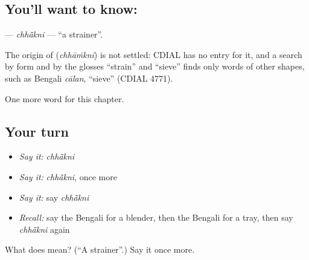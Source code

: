 \subsection*{You'll want to know: }
\textbf{} — \emph{chhā̃kni} — \textquotedblleft{}a strainer\textquotedblright{}.

\begin{cousinweb}
The origin of \textbf{} (\emph{chhāṁkni}) is not settled: CDIAL has no entry for it, and a search by form and by the glosses \textquotedblleft{}strain\textquotedblright{} and \textquotedblleft{}sieve\textquotedblright{} finds only words of other shapes, such as Bengali \emph{cālan}, \textquotedblleft{}sieve\textquotedblright{} (CDIAL 4771).
\end{cousinweb}

\begin{grammarlens}[title={What you've built}]
One more word for this chapter.
\end{grammarlens}

\subsection*{Your turn}
\begin{itemize}
\raggedright
  \item \emph{Say it:} \emph{chhā̃kni}
  \item \emph{Say it:} \emph{chhā̃kni}, once more
  \item \emph{Say it:} say \emph{chhā̃kni}
  \item \emph{Recall:} say the Bengali for a blender, then the Bengali for a tray, then say \emph{chhā̃kni} again
\end{itemize}

\begin{tcolorbox}[breakable,colback=teal!4,colframe=teal!35!black,title={Before you move on}]
What does  mean? (\textquotedblleft{}A strainer\textquotedblright{}.) Say it once more.
\end{tcolorbox}
